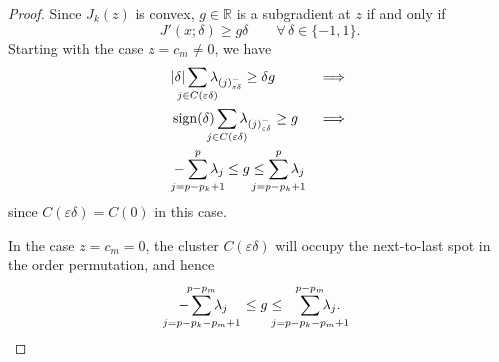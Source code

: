 \begin{proof}
  Since \(J_k(z)\) is convex, \(g \in \mathbb{R}\) is a
  subgradient at \(z\) if and only if~\cite[Theorem 23.2]{rockafellar1970}
  \begin{equation}
    \label{eq:subgrad-ineq}
    J'(x; \delta) \geq g\delta \qquad \forall\,\delta \in \{-1, 1\}.
  \end{equation}
  Starting with the case \(z = c_m \neq 0\), we have
  \[
    \begin{aligned}
                    & |\delta| \smashoperator{\sum_{j \in C(\varepsilon\delta)}} \lambda_{(j)^-_{\varepsilon\delta}} \geq \delta g & \implies                                                                                                             \\
                    & \sign(\delta) \smashoperator{\sum_{j \in C(\varepsilon\delta)}} \lambda_{(j)^-_{\varepsilon\delta}} \geq g                                & \implies \\
                    & -\smashoperator{\sum_{j = p - p_k + 1}^p} \lambda_j \leq g \leq \smashoperator{\sum_{j=p - p_k + 1}^p} \lambda_j
    \end{aligned}
  \]
  since \(C(\varepsilon\delta) = C(0)\) in this case.
  
  In the case \(z = c_m = 0\), the cluster \(C(\varepsilon\delta)\) will occupy the
  next-to-last spot in the order permutation, and hence
  \[
    -\smashoperator{\sum_{j = p - p_k - p_m + 1}^{p - p_m}} \lambda_j
    \quad \leq g \leq \quad
    \smashoperator{\sum_{j=p - p_k - p_m + 1}^{p - p_m}} \lambda_j.
  \]


\end{proof}
